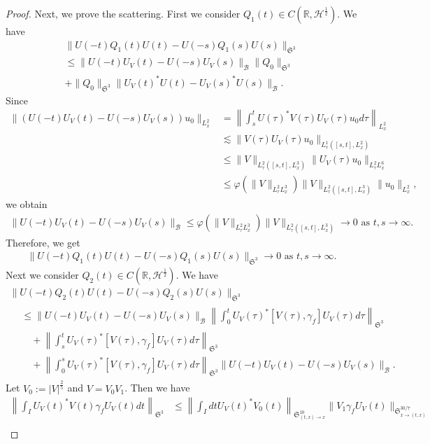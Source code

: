 \documentclass[AHL,Unicode,longabstracts,MathTools,published]{cedram}
\newcommand{\BR}{\mathbb{R}}
\newcommand{\CB}{\mathcal{B}}
\newcommand{\CH}{\mathcal{H}}
\newcommand{\FS}{\mathfrak{S}}
\newcommand{\ga}{\gamma}
\newcommand{\ph}{\varphi}
\newcommand{\ta}{\tau}
\renewcommand{\No}[1]{\left\| #1 \right\|}
\newcommand{\I}{\infty}
\newcommand{\tx}{{t,x}}
\newcommand{\tw}{\frac{1}{2}}
\newcommand{\ls}{\lesssim}
\begin{document}
\begin{proof}
Next, we prove the scattering. First we consider $Q_1(t) \in C(\BR,\CH^\tw)$. We have
\begin{multline}
\|U(-t)Q_1(t)U(t)-U(-s)Q_1(s)U(s)\|_{\FS^3} \\
\le \|U(-t)U_V(t)-U(-s)U_V(s)\|_{\CB} \|Q_0\|_{\FS^3}\\
+\|Q_0\|_{\FS^3} \big\|U_V(t)^*U(t)-U_V(s)^*U(s)\big\|_{\CB}.
\end{multline}
Since
\begin{equation}
\begin{split}
\|(U(-t)U_V(t)-U(-s)U_V(s))u_0\|_{L^2_x}
&= \No{ \int_s^t U(\ta)^* V(\ta) U_V(\ta) u_0 d\ta }_{L^2_x} \\
&\ls \|V(\ta) U_V(\ta)u_0\|_{L^1_\ta\left([s,t],L^2_x\right)} \\
&\le \|V\|_{L^2_\ta\left([s,t], L^3_x\right)} \|U_V(\ta)u_0\|_{L^2_\ta L^6_x} \\
&\le \ph\left(\|V\|_{L^2_\ta L^3_x}\right) \|V\|_{L^2_\ta\left([s,t], L^3_x\right)} \|u_0\|_{L^2_x},
\end{split}
\end{equation}
we obtain
\begin{align}\label{sc}
\|U(-t)U_V(t)-U(-s)U_V(s)\|_\CB \le \ph(\|V\|_{L^2_\ta L^3_x}) \|V\|_{L^2_\ta([s,t], L^3_x)} \to 0
\text{ as } t,s \to \I.
\end{align}
Therefore, we get
\begin{align}
\|U(-t)Q_1(t)U(t)-U(-s)Q_1(s)U(s)\|_{\FS^3} \to 0 \text{ as } t,s \to \I.
\end{align}
Next we consider $Q_2(t) \in C(\BR,\CH^\tw)$. We have
\begin{multline}
\|U(-t)Q_2(t)U(t)-U(-s)Q_2(s)U(s)\|_{\FS^3} \\
\begin{aligned}
&\le \|U(-t)U_V(t)-U(-s)U_V(s)\|_\CB
\No{\int_0^t U_V(\ta)^* [V(\ta),\ga_f]U_V(\ta) d\ta}_{\FS^3} \\
&\quad + \No{ \int_s^t U_V(\ta)^*[V(\ta),\ga_f] U_V(\ta) d\ta }_{\FS^3} \\
&\quad + \No{\int_0^s U_V(\ta)^* [V(\ta),\ga_f]U_V(\ta) d\ta}_{\FS^3}
\|U(-t)U_V(t)-U(-s)U_V(s)\|_\CB.
\end{aligned}
\end{multline}
Let $V_0 := |V|^{\frac{2}{5}}$ and $V = V_0 V_1$. Then we have
\begin{equation}
\begin{split}
\No{\int_I U_V(t)^*V(t)\ga_f U_V(t) dt}_{\FS^3} &\le \No{\int_I dt U_V(t)^* V_0(t) }_{\FS^{10}_{(\tx)\to x}} \|V_1 \ga_f U_V(t)\|_{\FS^{30/7}_{x \to(t,x)}} \\

\end{split}
\end{equation}
\end{proof}
\end{document}
